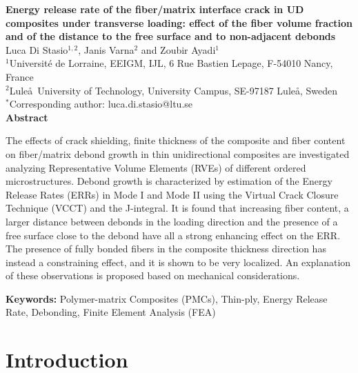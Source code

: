 \thispagestyle{plain}
\begin{center}
\Large\textbf{Energy release rate of the fiber/matrix interface crack in UD composites under transverse loading: effect of the fiber volume fraction and of the distance to the free surface and to non-adjacent debonds}\\
\vspace{10mm}
\normalsize Luca Di Stasio$^{1,2}$, Janis Varna$^{2}$ and Zoubir Ayadi$^{1}$\\
\vspace{5mm}
\normalsize $^{1}$Universit\'e de Lorraine, EEIGM, IJL, 6 Rue Bastien Lepage, F-54010 Nancy, France\\
\normalsize $^{2}$Lule\aa\ University of Technology, University Campus, SE-97187 Lule\aa, Sweden\\
\vspace{5mm}
\normalsize $^{*}$Corresponding author: luca.di.stasio@ltu.se\\
\vspace{15mm}
\textbf{Abstract}\\
\end{center}

The effects of crack shielding, finite thickness of the composite and fiber content on fiber/matrix debond growth in thin unidirectional composites are investigated analyzing  Representative Volume Elements (RVEs) of different ordered microstructures. Debond growth is characterized by estimation of the Energy Release Rates (ERRs) in Mode I and Mode II using the Virtual Crack Closure Technique (VCCT) and the J-integral. It is found that increasing fiber content, a larger distance between debonds in the loading direction and the presence of a free surface close to the debond have all a strong enhancing effect on the ERR. The presence of fully bonded fibers in the composite thickness direction has instead a constraining effect, and it is shown to be very localized. An explanation of these observations is proposed based on mechanical considerations.

\vspace{5mm}

\textbf{Keywords:} Polymer-matrix Composites (PMCs), Thin-ply, Energy Release Rate, Debonding, Finite Element Analysis (FEA)

\section{Introduction}

